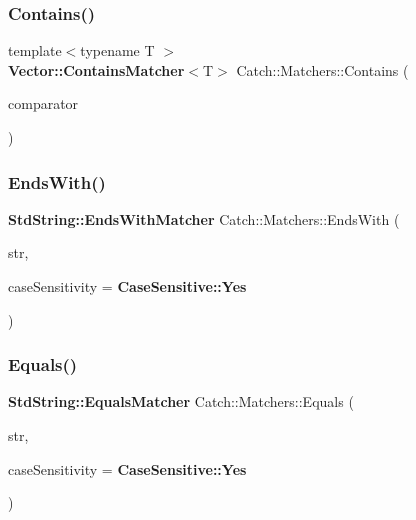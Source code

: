 \mbox{\label{namespace_catch_1_1_matchers_a4b3621740dc515216ad31ab827d4092c}} 
\subsubsection{Contains()\hspace{0.1cm}{\footnotesize\ttfamily [2/2]}}
{\footnotesize\ttfamily template$<$typename T $>$ \\
\textbf{ Vector\+::\+Contains\+Matcher}$<$T$>$ Catch\+::\+Matchers\+::\+Contains (\begin{DoxyParamCaption}\item[{std\+::vector$<$ T $>$ const \&}]{comparator }\end{DoxyParamCaption})}

\mbox{\label{namespace_catch_1_1_matchers_ae5a45efb4538c57c43e04f3f9043ad6e}} 
\subsubsection{EndsWith()}
{\footnotesize\ttfamily \textbf{ Std\+String\+::\+Ends\+With\+Matcher} Catch\+::\+Matchers\+::\+Ends\+With (\begin{DoxyParamCaption}\item[{std\+::string const \&}]{str,  }\item[{\textbf{ Case\+Sensitive\+::\+Choice}}]{case\+Sensitivity = {\ttfamily \textbf{ Case\+Sensitive\+::\+Yes}} }\end{DoxyParamCaption})}

\mbox{\label{namespace_catch_1_1_matchers_af8af7dfc338335ed4c788cb1b37fc59f}} 
\subsubsection{Equals()\hspace{0.1cm}{\footnotesize\ttfamily [1/2]}}
{\footnotesize\ttfamily \textbf{ Std\+String\+::\+Equals\+Matcher} Catch\+::\+Matchers\+::\+Equals (\begin{DoxyParamCaption}\item[{std\+::string const \&}]{str,  }\item[{\textbf{ Case\+Sensitive\+::\+Choice}}]{case\+Sensitivity = {\ttfamily \textbf{ Case\+Sensitive\+::\+Yes}} }\end{DoxyParamCaption})}

